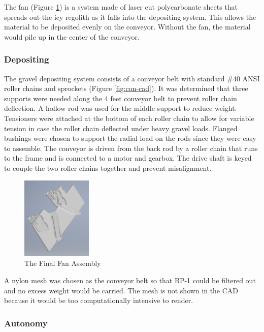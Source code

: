 \documentclass[class=article, crop=false]{standalone}
\begin{document}
	The fan (Figure \ref{fig:fan-cad}) is a system made of laser cut polycarbonate sheets that spreads out the icy regolith as it falls into the depositing system. This allows the material to be deposited evenly on the conveyor. Without the fan, the material would pile up in the center of the conveyor. 
	
	
	\subsubsection{Depositing}
	
	The gravel depositing system consists of a conveyor belt with standard \#40 ANSI roller chains and sprockets (Figure \ref{fig:con-cad}). It was determined that three supports were needed along the 4 feet conveyor belt to prevent roller chain deflection. A hollow rod was used for the middle support to reduce weight. Tensioners were attached at the bottom of each roller chain to allow for variable tension in case the roller chain deflected under heavy gravel loads. Flanged bushings were chosen to support the radial load on the rods since they were easy to assemble. The conveyor is driven from the back rod by a roller chain that runs to the frame and is connected to a motor and gearbox. The drive shaft is keyed to couple the two roller chains together and prevent misalignment. 
	
	\begin{figure}
	\centering
	 \includegraphics[width=0.3\textwidth]{09_Figures/fan-cad.jpg}
	 \caption{The Final Fan Assembly}
	 \label{fig:fan-cad}
	\end{figure}
	
	A nylon mesh was chosen as the conveyor belt so that BP-1 could be filtered out and no excess weight would be carried. The mesh is not shown in the CAD because it would be too computationally intensive to render.
	
	
	\subsubsection{Autonomy}
	
\end{document}
